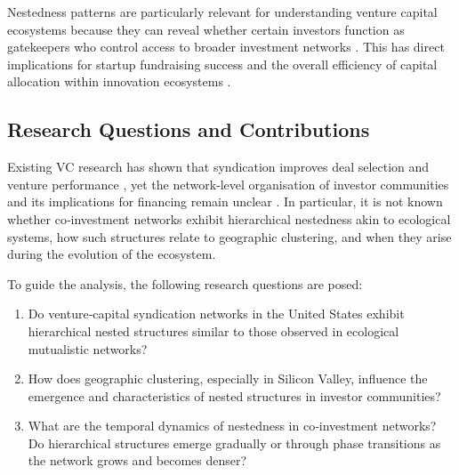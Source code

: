 Nestedness patterns are particularly relevant for understanding venture capital ecosystems because they can reveal whether certain investors function as gatekeepers who control access to broader investment networks \cite{Borgatti2011}. This has direct implications for startup fundraising success and the overall efficiency of capital allocation within innovation ecosystems \cite{Theophile2024}.


\subsection{Research Questions and Contributions}

Existing VC research has shown that syndication improves deal selection and venture performance \cite{Brander2002,Sorensen2007}, yet the network‑level organisation of investor communities and its implications for financing remain unclear \cite{Pruthi2005, Benzouai2021}.  In particular, it is not known whether co‑investment networks exhibit hierarchical nestedness akin to ecological systems, how such structures relate to geographic clustering, and when they arise during the evolution of the ecosystem.

To guide the analysis, the following research questions are posed:

\begin{enumerate}
    \item Do venture‑capital syndication networks in the United States exhibit hierarchical nested structures similar to those observed in ecological mutualistic networks?
    \item How does geographic clustering, especially in Silicon Valley, influence the emergence and characteristics of nested structures in investor communities?
    \item What are the temporal dynamics of nestedness in co‑investment networks?  Do hierarchical structures emerge gradually or through phase transitions as the network grows and becomes denser?
\end{enumerate}

